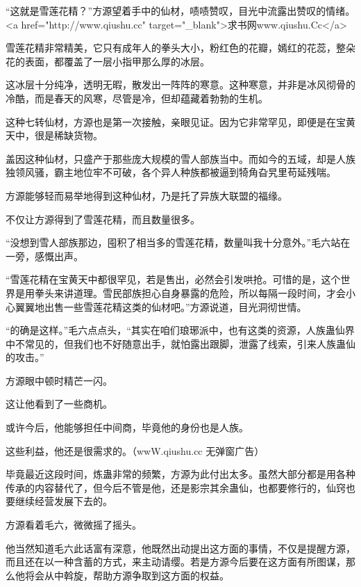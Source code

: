 
\begin{this_body}

“这就是雪莲花精？”方源望着手中的仙材，啧啧赞叹，目光中流露出赞叹的情绪。<a href="http://www.qiushu.cc" target="\_blank">求书网www.qiushu.Cc</a>

雪莲花精非常精美，它只有成年人的拳头大小，粉红色的花瓣，嫣红的花蕊，整朵花的表面，都覆盖了一层小指甲那么厚的冰层。

这冰层十分纯净，透明无暇，散发出一阵阵的寒意。这种寒意，并非是冰风彻骨的冷酷，而是春天的风寒，尽管是冷，但却蕴藏着勃勃的生机。

这种七转仙材，方源也是第一次接触，亲眼见证。因为它非常罕见，即便是在宝黄天中，很是稀缺货物。

盖因这种仙材，只盛产于那些庞大规模的雪人部族当中。而如今的五域，却是人族独领风骚，霸主地位牢不可破，各个异人种族都被逼到犄角旮旯里苟延残喘。

方源能够轻而易举地得到这种仙材，乃是托了异族大联盟的福缘。

不仅让方源得到了雪莲花精，而且数量很多。

“没想到雪人部族那边，囤积了相当多的雪莲花精，数量叫我十分意外。”毛六站在一旁，感慨出声。

“雪莲花精在宝黄天中都很罕见，若是售出，必然会引发哄抢。可惜的是，这个世界是用拳头来讲道理。雪民部族担心自身暴露的危险，所以每隔一段时间，才会小心翼翼地出售一些雪莲花精这类的仙材吧。”方源说道，目光洞彻世情。

“的确是这样。”毛六点点头，“其实在咱们琅琊派中，也有这类的资源，人族蛊仙界中不常见的，但我们也不好随意出手，就怕露出跟脚，泄露了线索，引来人族蛊仙的攻击。”

方源眼中顿时精芒一闪。

这让他看到了一些商机。

或许今后，他能够担任中间商，毕竟他的身份也是人族。

这些利益，他还是很需求的。（wwW.qiushu.cc 无弹窗广告）

毕竟最近这段时间，炼蛊非常的频繁，方源为此付出太多。虽然大部分都是用各种传承的内容替代了，但今后不管是他，还是影宗其余蛊仙，也都要修行的，仙窍也要继续经营发展下去的。

方源看着毛六，微微摇了摇头。

他当然知道毛六此话富有深意，他既然出动提出这方面的事情，不仅是提醒方源，而且还在以一种含蓄的方式，来主动请缨。若是方源今后要在这方面有所图谋，那么他将会从中斡旋，帮助方源争取到这方面的权益。


\end{this_body}
